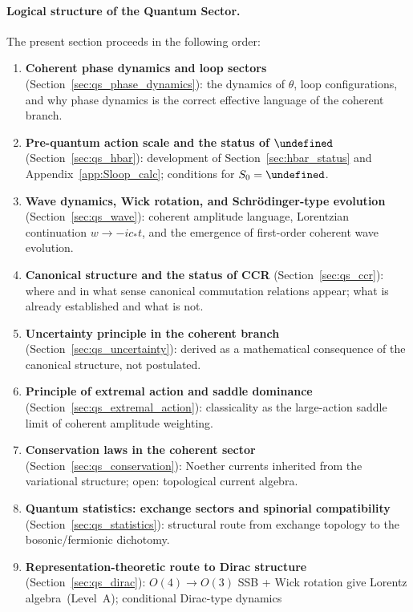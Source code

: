 \documentclass[11pt,a4paper]{article}
\let\hbar\undefined
\numberwithin{equation}{section}
\begin{document}
\paragraph{Logical structure of the Quantum Sector.}
The present section proceeds in the following order:
\begin{enumerate}[label=(\arabic*)]
  \item \textbf{Coherent phase dynamics and loop sectors}
    (Section~\ref{sec:qs_phase_dynamics}):
    the dynamics of $\theta$, loop configurations, and why
    phase dynamics is the correct effective language of the
    coherent branch.
  \item \textbf{Pre-quantum action scale and the status of $\hbar$}
    (Section~\ref{sec:qs_hbar}):
    development of Section~\ref{sec:hbar_status}
    and Appendix~\ref{app:Sloop_calc};
    conditions for $S_0 = \hbar$.
  \item \textbf{Wave dynamics, Wick rotation, and
    Schr\"odinger-type evolution}
    (Section~\ref{sec:qs_wave}):
    coherent amplitude language, Lorentzian continuation
    $w\to -ic_*t$, and the emergence of first-order
    coherent wave evolution.
  \item \textbf{Canonical structure and the status of CCR}
    (Section~\ref{sec:qs_ccr}):
    where and in what sense canonical commutation relations
    appear; what is already established and what is not.
  \item \textbf{Uncertainty principle in the coherent branch}
    (Section~\ref{sec:qs_uncertainty}):
    derived as a mathematical consequence of the canonical
    structure, not postulated.
  \item \textbf{Principle of extremal action and saddle dominance}
    (Section~\ref{sec:qs_extremal_action}):
    classicality as the large-action saddle limit of coherent
    amplitude weighting.
  \item \textbf{Conservation laws in the coherent sector}
    (Section~\ref{sec:qs_conservation}):
    Noether currents inherited from the variational structure;
    open: topological current algebra.
  \item \textbf{Quantum statistics: exchange sectors and
    spinorial compatibility}
    (Section~\ref{sec:qs_statistics}):
    structural route from exchange topology to the
    bosonic/fermionic dichotomy.
  \item \textbf{Representation-theoretic route to Dirac structure}
    (Section~\ref{sec:qs_dirac}):
    $O(4)\to O(3)$ SSB + Wick rotation give Lorentz
    algebra~(Level~A); conditional Dirac-type dynamics

\end{enumerate}
\end{document}
